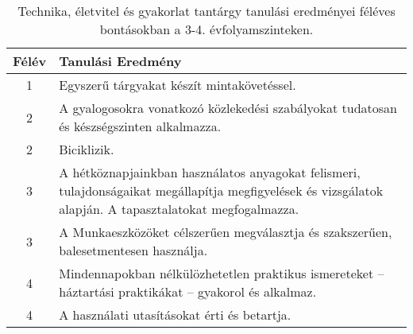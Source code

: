        
           \begin{longtable}{c | p{} }
            \caption[Technika, életvitel és gyakorlat 3-4.]{Technika, életvitel és gyakorlat tantárgy tanulási eredményei féléves bontásokban a 3-4. évfolyamszinteken. }  \\

            \textbf{Félév} & \textbf{Tanulási Eredmény} \\
            \hline
            \endhead
                                
                                          1 &  Egyszerű tárgyakat készít mintakövetéssel. \\ \hline
                                      
                                
                                          2 &  A gyalogosokra vonatkozó közlekedési szabályokat tudatosan és készségszinten alkalmazza. \\ \hline
                                          2 &  Biciklizik. \\ \hline
                                      
                                
                                          3 &  A hétköznapjainkban használatos anyagokat felismeri, tulajdonságaikat megállapítja megfigyelések és vizsgálatok alapján. A tapasztalatokat megfogalmazza. \\ \hline
                                          3 &  A Munkaeszközöket célszerűen megválasztja és szakszerűen, balesetmentesen használja. \\ \hline
                                      
                                
                                          4 &  Mindennapokban nélkülözhetetlen praktikus ismereteket – háztartási praktikákat – gyakorol és alkalmaz. \\ \hline
                                          4 &  A használati utasításokat érti és betartja. \\ \hline
                                      
                        \end{longtable}
            \clearpage

